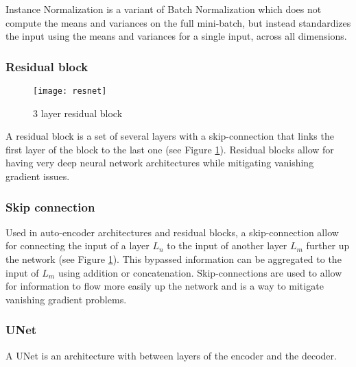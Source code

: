Instance Normalization \citep{Ulyanov2016} is a variant of Batch Normalization which does not compute the means and variances on the full mini-batch, but instead standardizes the input using the means and variances for a single input, across all dimensions.

\subsubsection*{Residual block} \label{gl:resblock}

\begin{figure}
	\centering
	\texttt{[image: resnet]}
	\caption{3 layer residual block}
	\label{fig:resblock}
\end{figure}

A residual block is a set of several layers with a skip-connection that links the first layer of the block to the last one (see Figure \ref{fig:resblock}). Residual blocks allow for having very deep neural network architectures while mitigating vanishing gradient issues.

\subsubsection*{Skip connection} \label{gl:skip}

Used in auto-encoder architectures and residual blocks, a skip-connection allow for connecting the input of a layer $L_n$ to the input of another layer $L_m$ further up the network (see Figure \ref{fig:resblock}). This bypassed information can be aggregated to the input of $L_m$ using addition or concatenation. Skip-connections are used to allow for information to flow more easily up the network and is a way to mitigate vanishing gradient problems.

\subsubsection*{UNet} \label{gl:unet} A UNet  \citep{Ronneberger2015} is an  architecture with  between layers of the encoder and the decoder.